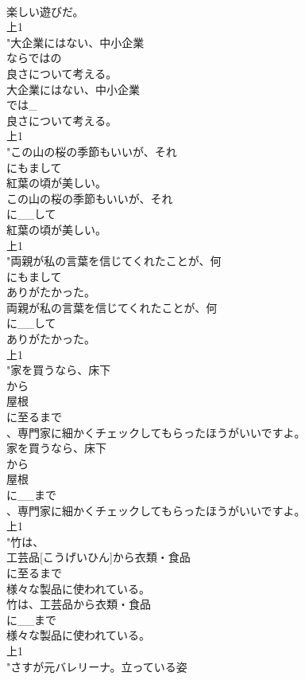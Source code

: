 \documentclass[8pt]{extreport}
\begin{document}
\begin{CJK}{UTF8}{min}
\\	楽しい遊びだ。
\\	上1
\\	"大企業にはない、中小企業
\\	ならではの
\\	良さについて考える。
\\	大企業にはない、中小企業
\\	では_
\\	良さについて考える。
\\	上1
\\	"この山の桜の季節もいいが、それ
\\	にもまして
\\	紅葉の頃が美しい。
\\	この山の桜の季節もいいが、それ
\\	に__して
\\	紅葉の頃が美しい。
\\	上1
\\	"両親が私の言葉を信じてくれたことが、何
\\	にもまして
\\	ありがたかった。
\\	両親が私の言葉を信じてくれたことが、何
\\	に__して
\\	ありがたかった。
\\	上1
\\	"家を買うなら、床下
\\	から
\\	屋根
\\	に至るまで
\\	、専門家に細かくチェックしてもらったほうがいいですよ。
\\	家を買うなら、床下
\\	から
\\	屋根
\\	に__まで
\\	、専門家に細かくチェックしてもらったほうがいいですよ。
\\	上1
\\	"竹は、
\\	工芸品[こうげいひん]から衣類・食品
\\	に至るまで
\\	様々な製品に使われている。
\\	竹は、工芸品から衣類・食品
\\	に__まで
\\	様々な製品に使われている。
\\	上1
\\	"さすが元バレリーナ。立っている姿

\end{CJK}
\end{document}
